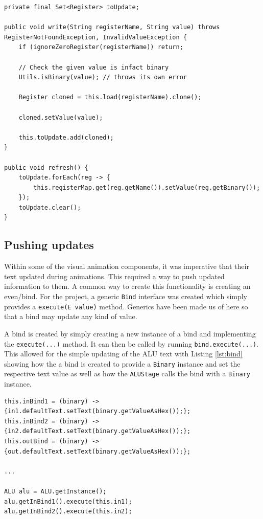 \begin{lstlisting}[caption={Refresh mechanism, writing buffered register values}, label=lst:reg_buffer]
private final Set<Register> toUpdate;

public void write(String registerName, String value) throws RegisterNotFoundException, InvalidValueException {
    if (ignoreZeroRegister(registerName)) return;

    // Check the given value is infact binary
    Utils.isBinary(value); // throws its own error

    Register cloned = this.load(registerName).clone();

    cloned.setValue(value);

    this.toUpdate.add(cloned);
}
    
public void refresh() {
    toUpdate.forEach(reg -> {
        this.registerMap.get(reg.getName()).setValue(reg.getBinary());
    });
    toUpdate.clear();
}
\end{lstlisting}

\subsection{Pushing updates}
Within some of the visual animation components, it was imperative that their text updated during animations. This required a way to push updated information to them. A common way to create this functionality is creating an even/bind. For the project, a generic \texttt{Bind} interface was created which simply provides a \verb|execute(E value)| method. Generics have been made us of here so that a bind may update any kind of value. 

A bind is created by simply creating a new instance of a bind and implementing the \verb|execute(...)| method. It can then be called by running \verb|bind.execute(...)|. This allowed for the simple updating of the \ac{ALU} text with Listing \ref{lst:bind} showing how the a bind is created to provide a \texttt{Binary} instance and set the respective text value as well as how the \texttt{ALUStage} calls the bind with a \texttt{Binary} instance.

\begin{lstlisting}[caption=\ac{ALU} bind creation and execution, label=lst:bind]
this.inBind1 = (binary) -> {in1.defaultText.setText(binary.getValueAsHex());};
this.inBind2 = (binary) -> {in2.defaultText.setText(binary.getValueAsHex());};
this.outBind = (binary) -> {out.defaultText.setText(binary.getValueAsHex());};

...

ALU alu = ALU.getInstance();
alu.getInBind1().execute(this.in1); 
alu.getInBind2().execute(this.in2);
\end{lstlisting}

